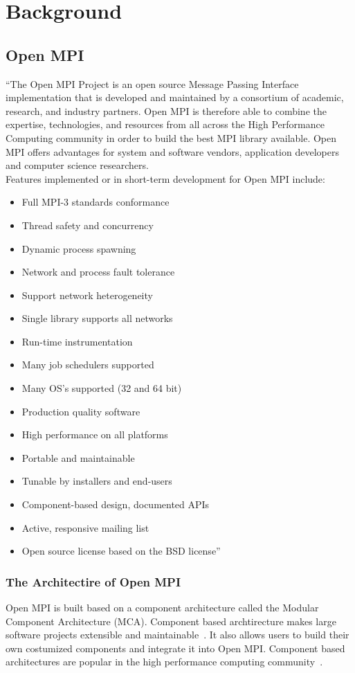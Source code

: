 \chapter{Background}
\label{sec:Background}

\section{Open MPI}
\label{sec:openmpi}
``The Open MPI Project is an open source Message Passing Interface implementation that is developed and maintained by a consortium of academic, research, and industry partners. Open MPI is therefore able to combine the expertise, technologies, and resources from all across the High Performance Computing community in order to build the best MPI library available. Open MPI offers advantages for system and software vendors, application developers and computer science researchers.\\
Features implemented or in short-term development for Open MPI include:
\begin{itemize}
  \item Full MPI-3 standards conformance
  \item Thread safety and concurrency
  \item Dynamic process spawning
  \item Network and process fault tolerance
  \item Support network heterogeneity
  \item Single library supports all networks
  \item Run-time instrumentation
  \item Many job schedulers supported
  \item Many OS's supported (32 and 64 bit)
  \item Production quality software
  \item High performance on all platforms
  \item Portable and maintainable
  \item Tunable by installers and end-users
  \item Component-based design, documented APIs
  \item Active, responsive mailing list
  \item Open source license based on the BSD license''~\cite{openmpi}
\end{itemize}
    
\subsection{The Architectire of Open MPI}
Open MPI is built based on a component architecture called the Modular Component Architecture (MCA). Component based archtirecture makes large software projects extensible and maintainable~\cite{barrett2005analysis,graham2006open}. It also allows users to build their own costumized components and integrate it into Open MPI. Component based architectures are popular in the high performance computing community~\cite{squyres2003component,bernholdt2006component}.

